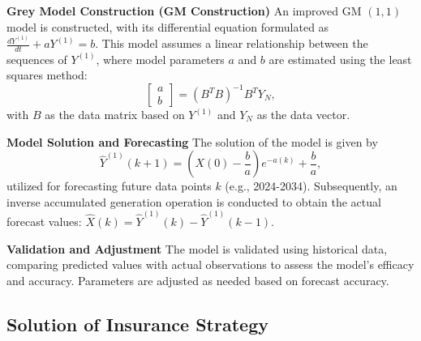 \documentclass[12pt]{article}
\begin{document}
\textbf{Grey Model Construction (GM Construction)}
An improved GM $(1,1)$ model is constructed, with its differential equation formulated as $\frac{d Y^{(1)}}{d t}+a Y^{(1)}=b$. This model assumes a linear relationship between the sequences of $Y^{(1)}$, where model parameters $a$ and $b$ are estimated using the least squares method: 
\begin{equation}
    \left[\begin{array}{l}a \\ b\end{array}\right]=\left(B^T B\right)^{-1} B^T Y_N,
\end{equation}
with $B$ as the data matrix based on $Y^{(1)}$ and $Y_N$ as the data vector.

\textbf{Model Solution and Forecasting}
The solution of the model is given by 
\begin{equation}
    \hat{Y}^{(1)}(k+1)=\left(X(0)-\frac{b}{a}\right) e^{-a(k)}+\frac{b}{a},
\end{equation}
utilized for forecasting future data points $k$ (e.g., 2024-2034). Subsequently, an inverse accumulated generation operation is conducted to obtain the actual forecast values: $\hat{X}(k)=\hat{Y}^{(1)}(k)-\hat{Y}^{(1)}(k-1)$.

\textbf{Validation and Adjustment}
The model is validated using historical data, comparing predicted values with actual observations to assess the model's efficacy and accuracy. Parameters are adjusted as needed based on forecast accuracy.
\subsection{Solution of Insurance Strategy}
\end{document}
